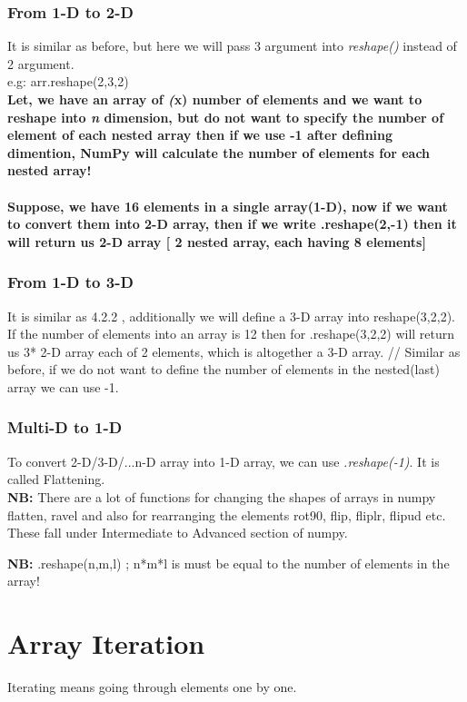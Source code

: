 \documentclass[openany]{book}
\begin{document}
\subsection{From 1-D to 2-D}
It is similar as before, but here we will pass 3 argument into \textit{reshape()} instead of 2 argument. \\
e.g: arr.reshape(2,3,2)
\\
\textbf{Let, we have an array of \textit(x) number of elements and we want to reshape into \textit{n} dimension, but do not want to specify the number of element of each nested array then if we use -1 after defining dimention, NumPy will calculate the number of elements for each nested array!} \\
\subsubsection*{Suppose, we have 16 elements in a single array(1-D), now if we want to convert them into 2-D array, then if we write .reshape(2,-1) then it will return us 2-D array [ 2 nested array, each having 8 elements]}

\subsection{From 1-D to 3-D}
It is similar as 4.2.2 , additionally we will define a 3-D array into reshape(3,2,2). If the number of elements into an array is 12 then for .reshape(3,2,2) will return us 3* 2-D array each of 2 elements, which is altogether a 3-D array. //
Similar as before, if we do not want to define the number of elements in the nested(last) array we can use -1.

\subsection{Multi-D to 1-D}
To convert 2-D/3-D/...n-D array into 1-D array, we can use \textit{.reshape(-1)}. It is called Flattening. \\

\textbf{NB:} There are a lot of functions for changing the shapes of arrays in numpy flatten, ravel and also for rearranging the elements rot90, flip, fliplr, flipud etc. These fall under Intermediate to Advanced section of numpy.

\textbf{NB:} .reshape(n,m,l) ; n*m*l is must be equal to the number of elements in the array!



\chapter{Array Iteration}
Iterating means going through elements one by one. \\
\end{document}
